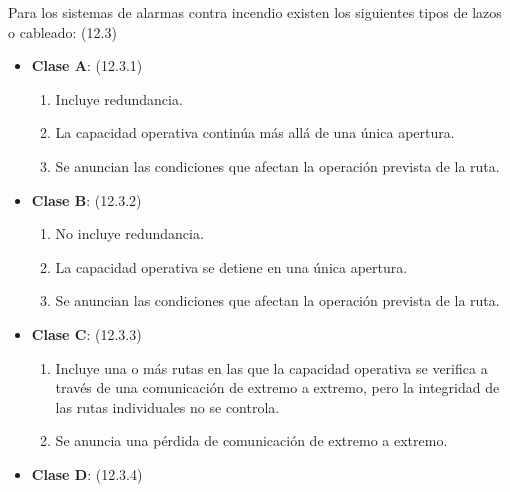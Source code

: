 Para los sistemas de alarmas contra incendio existen los siguientes tipos de lazos o cableado: (12.3)\cite{NFPA72}\\


\begin{itemize}
	
	\item \textbf{Clase A}:  (12.3.1)
	
	\begin{enumerate}
		
		\item Incluye redundancia.
		
		\item La capacidad operativa continúa más allá de una única apertura.
		
		\item Se anuncian las condiciones que afectan la operación prevista de la ruta.
		
	\end{enumerate}
	
	\item \textbf{Clase B}: (12.3.2)
	
	\begin{enumerate}
	
	\item No incluye redundancia.
	
	\item La capacidad operativa se detiene en una única apertura.
	
	\item Se anuncian las condiciones que afectan la operación prevista de la ruta.
	
	\end{enumerate}	
	
	\item \textbf{Clase C}: (12.3.3)
	
	\begin{enumerate}
	
	\item Incluye una o más rutas en las que la capacidad operativa se verifica a través de una comunicación de extremo a extremo, pero la integridad de las rutas individuales no se controla.
	
	\item Se anuncia una pérdida de comunicación de extremo a extremo.
	
	\end{enumerate}	
	
	\item \textbf{Clase D}: (12.3.4)
	

\end{itemize}
